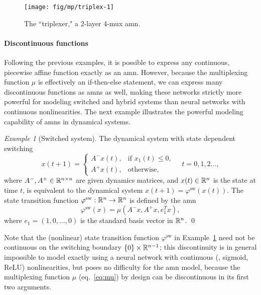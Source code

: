 \documentclass[10pt]{article}
\newcommand{\amn}{\varphi}
\theoremstyle{remark}
\newtheorem{example}{Example}
\theoremstyle{definition}
\theoremstyle{plain}
\begin{document}
\begin{figure}[htpb]
	\centering
	\texttt{[image: fig/mp/triplex-1]}
	\caption{The ``triplexer," a 2-layer 4-mux \acl{amn}.}
	\label{fig:triplex1}
\end{figure}


\paragraph{Discontinuous functions}
Following the previous examples, it is possible to express any
continuous, piecewise affine function exactly as an \acs{amn}. 
However, because the multiplexing function $\mu$ is effectively an if-then-else
statement, we can express many discontinuous functions as \acsp{amn} as well,
making these networks strictly more powerful for modeling
switched and hybrid systems than neural networks with continuous nonlinearities. 
The next example illustrates the powerful
modeling capability of \acsp{amn} in dynamical systems.


\begin{example}[Switched system]\label{ex:switched}
The dynamical system
with state dependent switching
\begin{equation}
	\label{eq:switched_lin}
	x(t+1) = \left\{
	\begin{array}{ll}
		A^- x(t), & \text{if } x_1(t) \leq 0,\\
		A^+ x(t), & \text{otherwise},
	\end{array}
	\right.
	\quad t = 0,1,2\ldots,
\end{equation}
where $A^-,A^+\in\mathbb{R}^{n\times n}$ are given dynamics matrices, and
$x(t)\in\mathbb{R}^n$ is the state at time $t$,
is equivalent to
the dynamical system
$x(t+1) = \amn^\mathrm{sw}(x(t))$. The state transition function
$\amn^\mathrm{sw}:\reals^n\to\reals^n$ 
is defined by the \acl{amn}
\[
	\amn^\mathrm{sw}(x) = \mu(A^- x, A^+ x, e_1^Tx),
\]
where $e_1 = (1,0,\ldots,0)$ is the standard basis vector in $\mathbb{R}^n$.
\qed
\end{example}

Note that the (nonlinear) state transition function $\amn^\mathrm{sw}$ in
Example~\ref{ex:switched} need not be continuous on the switching boundary
$\{0\}\times \mathbb{R}^{n-1}$; this discontinuity is in general impossible to
model exactly using a neural network with continuous (\eg, sigmoid, ReLU)
nonlinearities, but poses no difficulty for the \acs{amn} model, because the
multiplexing function $\mu$ (eq.~\eqref{eq:mu}) by design can be discontinuous
in its first two arguments.
\end{document}

